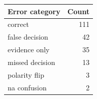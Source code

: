 \begin{tabular}{lr}\toprule
Error category & Count \\\midrule
correct & 111 \\
false decision & 42 \\
evidence only & 35 \\
missed decision & 13 \\
polarity flip & 3 \\
na confusion & 2 \\
\bottomrule\end{tabular}
